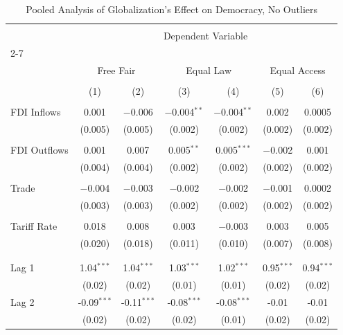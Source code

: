 
\begin{table}[!htbp] \centering 
  \caption{Pooled Analysis of Globalization's Effect on Democracy, No Outliers} 
  \label{} 
\small 
\begin{tabular}{@{\extracolsep{2pt}}lcccccc} 
\\[-1.8ex]\hline 
\hline \\[-1.8ex] 
 & \multicolumn{6}{c}{Dependent Variable} \\ 
\cline{2-7} 
\\[-1.8ex] & \multicolumn{2}{c}{Free Fair} & \multicolumn{2}{c}{Equal Law} & \multicolumn{2}{c}{Equal Access} \\ 
\\[-1.8ex] & (1) & (2) & (3) & (4) & (5) & (6)\\ 
\hline \\[-1.8ex] 
 FDI Inflows & 0.001 & $-$0.006 & $-$0.004$^{**}$ & $-$0.004$^{**}$ & 0.002 & 0.0005 \\ 
  & (0.005) & (0.005) & (0.002) & (0.002) & (0.002) & (0.002) \\ 
  & & & & & & \\ 
 FDI Outflows & 0.001 & 0.007 & 0.005$^{**}$ & 0.005$^{***}$ & $-$0.002 & 0.001 \\ 
  & (0.004) & (0.004) & (0.002) & (0.002) & (0.002) & (0.002) \\ 
  & & & & & & \\ 
 Trade & $-$0.004 & $-$0.003 & $-$0.002 & $-$0.002 & $-$0.001 & 0.0002 \\ 
  & (0.003) & (0.003) & (0.002) & (0.002) & (0.002) & (0.002) \\ 
  & & & & & & \\ 
 Tariff Rate & 0.018 & 0.008 & 0.003 & $-$0.003 & 0.003 & 0.005 \\ 
  & (0.020) & (0.018) & (0.011) & (0.010) & (0.007) & (0.008) \\ 
  & & & & & & \\ 
\hline \\[-1.8ex] 
Lag 1 & 1.04$^{***}$ & 1.04$^{***}$ & 1.03$^{***}$ & 1.02$^{***}$ & 0.95$^{***}$ & 0.94$^{***}$ \\ 
 & (0.02) & (0.02) & (0.01) & (0.01) & (0.02) & (0.02) \\ 
Lag 2 & -0.09$^{***}$ & -0.11$^{***}$ & -0.08$^{***}$ & -0.08$^{***}$ & -0.01 & -0.01 \\ 
 & (0.02) & (0.02) & (0.02) & (0.01) & (0.02) & (0.02) \\ 

\end{tabular}
\end{table}
